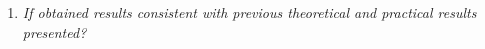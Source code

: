 \documentclass[runningheads,a4paper]{llncs}
\begin{document}
\begin{enumerate}
%
\item \textit{If obtained results consistent with previous theoretical and practical results presented?}  %
%

\end{enumerate}




\end{document}
